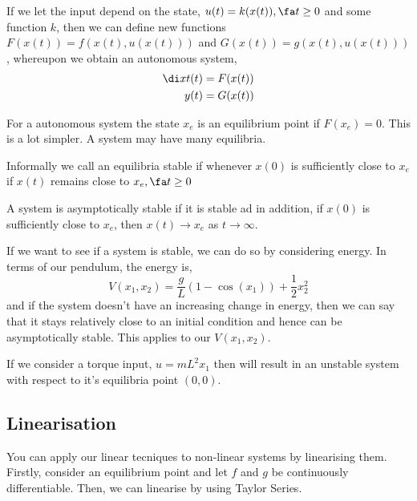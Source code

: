 If we let the input depend on the state, $u(t) = k(x(t)), \fa t \ge 0$ and some function $k$, then we can define new functions $F(x(t)) = f(x(t), u(x(t)))$ and $G(x(t)) = g(x(t), u(x(t)))$, whereupon we obtain an autonomous system,
\begin{align*}
  \di x t (t) &= F(x(t))\\
  y(t) &= G(x(t))
\end{align*}

For a autonomous system the state $x_e$ is an equilibrium point if $F(x_e) = 0$. This is a lot simpler. A system may have many equilibria.

\begin{ndefi}[Stability]
  Informally we call an equilibria stable if whenever $x(0)$ is sufficiently close to $x_e$ if $x(t)$ remains close to $x_e, \fa t \ge 0$
\end{ndefi}

\begin{ndefi}
  A system is asymptotically stable if it is stable ad in addition, if $x(0)$ is sufficiently close to $x_e$, then $x(t) \to x_e$ as $t \to \infty$.
\end{ndefi}

If we want to see if a system is stable, we can do so by considering energy. In terms of our pendulum, the energy is,
$$ V(x_1, x_2) = \frac{g}{L}(1 - \cos(x_1)) + \frac{1}{2}x_2^2 $$
and if the system doesn't have an increasing change in energy, then we can say that it stays relatively close to an initial condition and hence can be asymptotically stable. This applies to our $V(x_1, x_2)$.

If we consider a torque input, $u = mL^2x_1$ then will result in an unstable system with respect to it's equilibria point $(0, 0)$.

\subsection{Linearisation}
You can apply our linear tecniques to non-linear systems by linearising them. Firstly, consider an equilibrium point and let $f$ and $g$ be continuously differentiable. Then, we can linearise by using Taylor Series.\\

